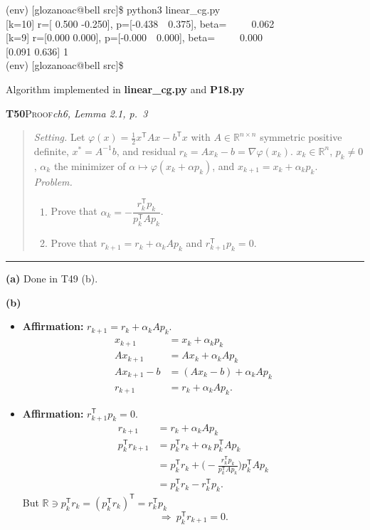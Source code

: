 \documentclass[11pt,a4paper]{article}
\newcommand{\T}{^{\mathsf T}}
\newcommand{\task}[3]{\par\medskip\noindent\textbf{#1}\quad\textsc{#2}\hfill\textit{#3}\par\smallskip}
\newenvironment{statement}{\begin{quote}\small}{\end{quote}\vspace{-0.3em}\noindent\textcolor{gray}{\rule{\linewidth}{0.6pt}}\par\medskip}
\newcommand{\console}[1]{\par\noindent\colorbox{codebg}{\parbox{\dimexpr\linewidth-2\fboxsep}{\color{white}\scriptsize\ttfamily #1}}\par}
\begin{document}
\console{%
(env) [glozanoac@bell src]\$ python3 linear\_cg.py\\
{}[k=10] r=[ 0.500 -0.250], p=[-0.438\ \ 0.375], beta=\ \ \ \ \ 0.062\\
{}[k=9] r=[0.000 0.000], p=[-0.000\ \ 0.000], beta=\ \ \ \ \ 0.000\\
{}[0.091 0.636] 1\\
(env) [glozanoac@bell src]\$}

{\color{note}Algorithm implemented in \textcolor{remark}{\textbf{linear\_cg.py}} and \textcolor{remark}{\textbf{P18.py}}}

\task{T50}{Proof}{ch6, Lemma 2.1, p.\ 3}
\begin{statement}
\emph{Setting.} Let $\varphi(x)=\tfrac12x\T Ax-b\T x$ with $A\in\mathbb R^{n\times n}$ symmetric positive definite, $x^*=A^{-1}b$, and residual $r_k=Ax_k-b=\nabla\varphi(x_k)$. $x_k\in\mathbb R^n$, $p_k\neq0$, $\alpha_k$ the minimizer of $\alpha\mapsto\varphi(x_k+\alpha p_k)$, and $x_{k+1}=x_k+\alpha_kp_k$.\\
\emph{Problem.}
\begin{enumerate}[label=\alph*)]
\item Prove that $\alpha_k=-\dfrac{r_k\T p_k}{p_k\T Ap_k}$.
\item Prove that $r_{k+1}=r_k+\alpha_kAp_k$ and $r_{k+1}\T p_k=0$.
\end{enumerate}
\end{statement}

\textbf{(a)} Done in T49 (b).

\textbf{(b)}
\begin{itemize}
\item \textbf{Affirmation:} $r_{k+1}=r_k+\alpha_kAp_k$.
\begin{align*}
x_{k+1}&=x_k+\alpha_kp_k\\
Ax_{k+1}&=Ax_k+\alpha_kAp_k\\
Ax_{k+1}-b&=(Ax_k-b)+\alpha_kAp_k\\
r_{k+1}&=r_k+\alpha_kAp_k .
\end{align*}
\item \textbf{Affirmation:} $r_{k+1}\T p_k=0$.
\begin{align*}
r_{k+1}&=r_k+\alpha_kAp_k\\
p_k\T r_{k+1}&=p_k\T r_k+\alpha_k\,p_k\T Ap_k\\
&=p_k\T r_k+\Big(-\frac{r_k\T p_k}{p_k\T Ap_k}\Big)p_k\T Ap_k\\
&=p_k\T r_k-r_k\T p_k .
\end{align*}
But $\mathbb R\ni p_k\T r_k=(p_k\T r_k)\T=r_k\T p_k$
\[
\Rightarrow\ p_k\T r_{k+1}=0 .
\]
\end{itemize}
\end{document}
